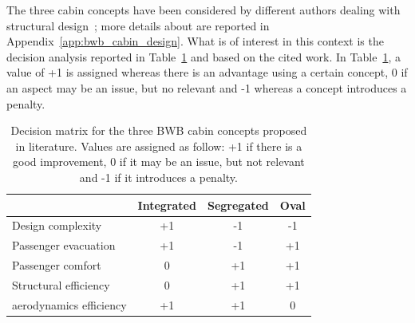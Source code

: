 The three cabin concepts have been considered by different authors dealing with structural design~\cite{bib:mukhopadhayay_2004, bib:mukhopadhayay_2005, bib:qian, bib:hansen}; more details about are reported in Appendix~\ref{app:bwb_cabin_design}. 
What is of interest in this context is the decision analysis reported in Table~\ref{tab:bwb_cabin_structure_synthesis} and based on the cited work.
In Table~\ref{tab:bwb_cabin_structure_synthesis}, a value of +1 is assigned whereas there is an advantage using a certain concept, 0 if an aspect may be an issue, but no relevant and -1 whereas a concept introduces a penalty. 
\begin{table}[!h]
	\centering
	\begin{tabular}{l| c| c| c|}
		\cline{2-4}
		& Integrated & Segregated & Oval \\
		\hline
		\multicolumn{1}{|l|}{Design complexity} & +1 & -1 & -1 \\
		\multicolumn{1}{|l|}{Passenger evacuation} & +1 & -1 & +1 \\
		\multicolumn{1}{|l|}{Passenger comfort} & 0 & +1 & +1 \\
		\multicolumn{1}{|l|}{Structural efficiency} & 0 & +1 & +1 \\
		\multicolumn{1}{|l|}{aerodynamics efficiency} & +1 & +1 & 0 \\ 
		\hline
	\end{tabular}
	\caption{Decision matrix for the three BWB cabin concepts proposed in literature. Values are assigned as follow: +1 if there is a good improvement, 0 if it may be an issue, but not relevant and -1 if it introduces a penalty.}
	\label{tab:bwb_cabin_structure_synthesis}
\end{table}

